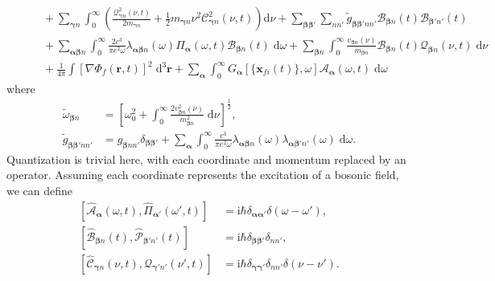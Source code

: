 \documentclass{article}
\begin{document}
\begin{equation}
\begin{split}
&\qquad + \sum_{\bm{\gamma}n}\int_0^\infty\left(\frac{\mathcal{Q}_{\bm{\gamma}n}^2(\nu,t)}{2m_{\bm{\gamma}n}} + \frac{1}{2}m_{\bm{\gamma}n}\nu^2\mathcal{C}_{\bm{\gamma}n}^2(\nu,t)\right)\mathrm{d}\nu + \sum_{\bm{\beta}\bm{\beta}'}\sum_{nn'}\tilde{g}_{\bm{\beta}\bm{\beta}'nn'}\mathcal{B}_{\bm{\beta}n}(t)\mathcal{B}_{\bm{\beta}'n'}(t)\\
&\qquad + \sum_{\bm{\alpha}\bm{\beta}n}\int_0^\infty\frac{2c^3}{\pi e^2\omega}\lambda_{\bm{\alpha}\bm{\beta}n}(\omega)\mathit{\Pi}_{\bm{\alpha}}(\omega,t)\mathcal{B}_{\bm{\beta}n}(t)\;\mathrm{d}\omega + \sum_{\bm{\beta}n}\int_0^\infty\frac{v_{\bm{\beta}n}(\nu)}{m_{\bm{\beta}n}}\mathcal{B}_{\bm{\beta}n}(t)\mathcal{Q}_{\bm{\beta}n}(\nu,t)\;\mathrm{d}\nu\\
&\qquad + \frac{1}{4\pi}\int\left[\nabla\Phi_f(\mathbf{r},t)\right]^2\;\mathrm{d}^3\mathbf{r} + \sum_{\bm{\alpha}}\int_0^\infty G_{\bm{\alpha}}[\{\mathbf{x}_{fi}(t)\},\omega]\mathcal{A}_{\bm{\alpha}}(\omega,t)\;\mathrm{d}\omega
\end{split}
\end{equation}
where
\begin{equation}
\begin{split}
\tilde{\omega}_{\bm{\beta}n} &= \left[\omega_0^2 + \int_0^\infty\frac{2v_{\bm{\beta}n}^2(\nu)}{m_{\bm{\beta}n}^2}\;\mathrm{d}\nu\right]^\frac{1}{2},\\
\tilde{g}_{\bm{\beta}\bm{\beta}'nn'} &= g_{\bm{\beta}nn'}\delta_{\bm{\beta}\bm{\beta}'} + \sum_{\bm{\alpha}}\int_0^\infty\frac{c^3}{\pi e^2\omega}\lambda_{\bm{\alpha}\bm{\beta}n}(\omega)\lambda_{\bm{\alpha}\bm{\beta}'n'}(\omega)\;\mathrm{d}\omega.
\end{split}
\end{equation}
Quantization is trivial here, with each coordinate and momentum replaced by an operator. Assuming each coordinate represents the excitation of a bosonic field, we can define
\begin{equation}
\begin{split}
\left[\hat{\mathcal{A}}_{\bm{\alpha}}(\omega,t),\hat{\mathit{\Pi}}_{\bm{\alpha}'}(\omega',t)\right] &= \mathrm{i}\hbar\delta_{\bm{\alpha}\bm{\alpha}'}\delta(\omega - \omega'),\\
\left[\hat{\mathcal{B}}_{\bm{\beta}n}(t),\hat{\mathcal{P}}_{\bm{\beta}'n'}(t)\right] &= \mathrm{i}\hbar\delta_{\bm{\beta}\bm{\beta}'}\delta_{nn'},\\
\left[\hat{\mathcal{C}}_{\bm{\gamma}n}(\nu,t),\hat{\mathcal{Q}}_{\bm{\gamma'}n'}(\nu',t)\right] &= \mathrm{i}\hbar\delta_{\bm{\gamma}\bm{\gamma}'}\delta_{nn'}\delta(\nu - \nu').
\end{split}
\end{equation}
\end{document}
